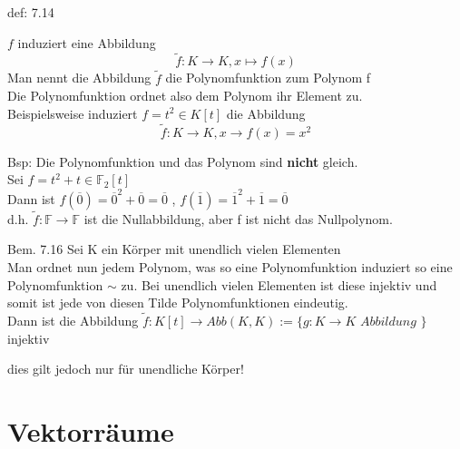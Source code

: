 \documentclass[smallheadings,12pt,a4paper]{scrartcl}
\begin{document}
\begin{center}
\item[def: 7.14]
\end{center}
\item $f $ induziert eine Abbildung 
$$ \tilde{f} : K \rightarrow K , x \mapsto f(x)$$
Man nennt die Abbildung $\tilde{f}$ die Polynomfunktion zum Polynom f \\

Die Polynomfunktion ordnet also dem Polynom ihr Element zu. \\

Beispielsweise induziert $f=t^2 \in K[t]$ die Abbildung \\
$$ \tilde{f}: K \rightarrow K, x \rightarrow f(x)=x^2 $$

 

\item Bsp:
Die Polynomfunktion und das Polynom sind \textbf{nicht} gleich. \\
Sei $f = t^2 + t  \in \mathbb{F}_2[t]$  \\
Dann ist $f(\overline{0})= \overline{0}^2+\overline{0} = \overline{0} $ , $f(\overline{1})=\overline{1}^2+\overline{1}=\overline{0}$ \\

d.h. $\tilde{f}:\mathbb{F} \rightarrow \mathbb{F}$ ist die Nullabbildung, aber f ist nicht das Nullpolynom. \\

\newpage

\item[Bem. 7.16] 
Sei K ein Körper mit unendlich vielen Elementen \\
Man ordnet nun jedem Polynom, was so eine Polynomfunktion induziert so eine Polynomfunktion $\sim$ zu. Bei unendlich vielen Elementen ist diese injektiv und somit ist jede von diesen Tilde Polynomfunktionen eindeutig. \\
Dann ist die Abbildung $ \tilde{f}: K[t] \rightarrow Abb(K,K):=\{g: K \rightarrow K \textit{ Abbildung }\} $ injektiv \\

\item dies gilt jedoch nur für unendliche Körper!\\

\newpage

\section*{Vektorräume}
\end{document}
